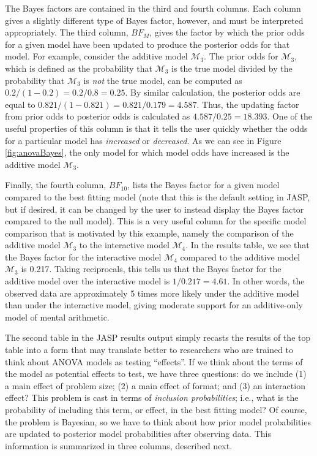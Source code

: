 \documentclass[english,,doc,floatsintext]{apa6}
\begin{document}
The Bayes factors are contained in the third and fourth columns. Each column gives a slightly different type of Bayes factor, however, and must be interpreted appropriately. The third column, \(BF_M\), gives the factor by which the prior odds for a given model have been updated to produce the posterior odds for that model. For example, consider the additive model \(\mathcal{M}_3\). The prior odds for \(\mathcal{M}_3\), which is defined as the probability that \(\mathcal{M}_3\) is the true model divided by the probability that \(\mathcal{M}_3\) is \emph{not} the true model, can be computed as \(0.2/(1-0.2) = 0.2/0.8 = 0.25\). By similar calculation, the posterior odds are equal to \(0.821/(1-0.821) = 0.821/0.179 = 4.587\). Thus, the updating factor from prior odds to posterior odds is calculated as \(4.587/0.25 = 18.393\). One of the useful properties of this column is that it tells the user quickly whether the odds for a particular model has \emph{increased} or \emph{decreased}. As we can see in Figure \ref{fig:anovaBayes}, the only model for which model odds have increased is the additive model \(\mathcal{M}_3\).

Finally, the fourth column, \(BF_{10}\), lists the Bayes factor for a given model compared to the best fitting model (note that this is the default setting in JASP, but if desired, it can be changed by the user to instead display the Bayes factor compared to the null model). This is a very useful column for the specific model comparison that is motivated by this example, namely the comparison of the additive model \(\mathcal{M}_3\) to the interactive model \(\mathcal{M}_4\). In the results table, we see that the Bayes factor for the interactive model \(\mathcal{M}_4\) compared to the additive model \(\mathcal{M}_3\) is 0.217. Taking reciprocals, this tells us that the Bayes factor for the additive model over the interactive model is \(1/0.217 = 4.61\). In other words, the observed data are approximately 5 times more likely under the additive model than under the interactive model, giving moderate support for an additive-only model of mental arithmetic.

The second table in the JASP results output simply recasts the results of the top table into a form that may translate better to researchers who are trained to think about ANOVA models as testing \enquote{effects}. If we think about the terms of the model as potential effects to test, we have three questions: do we include (1) a main effect of problem size; (2) a main effect of format; and (3) an interaction effect? This problem is cast in terms of \emph{inclusion probabilities}; i.e., what is the probability of including this term, or effect, in the best fitting model? Of course, the problem is Bayesian, so we have to think about how prior model probabilities are updated to posterior model probabilities after observing data. This information is summarized in three columns, described next.
\end{document}
